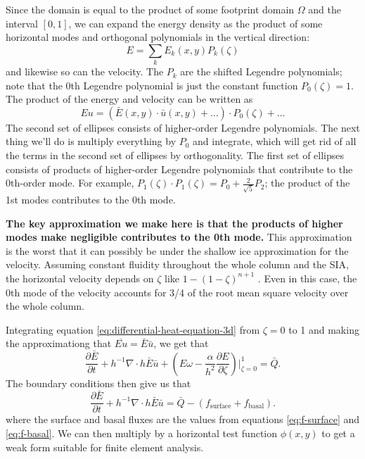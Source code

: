 \documentclass{article}
\theoremstyle{definition}
\theoremstyle{plain}
\begin{document}
Since the domain is equal to the product of some footprint domain $\Omega$ and the interval $[0, 1]$, we can expand the energy density as the product of some horizontal modes and orthogonal polynomials in the vertical direction:
\begin{equation}
    E = \sum_kE_k(x, y)P_k(\zeta)
\end{equation}
and likewise so can the velocity.
The $P_k$ are the shifted Legendre polynomials; note that the 0th Legendre polynomial is just the constant function $P_0(\zeta) = 1$.
The product of the energy and velocity can be written as
\begin{equation}
    Eu = \left(\bar E(x, y)\cdot\bar u(x, y) + \ldots\right)\cdot P_0(\zeta) + \ldots
\end{equation}
The second set of ellipses consists of higher-order Legendre polynomials.
The next thing we'll do is multiply everything by $P_0$ and integrate, which will get rid of all the terms in the second set of ellipses by orthogonality.
The first set of ellipses consists of products of higher-order Legendre polynomials that contribute to the 0th-order mode.
For example, $P_1(\zeta)\cdot P_1(\zeta) = P_0 + \frac{2}{\sqrt{5}}P_2$; the product of the 1st modes contributes to the 0th mode.

\textbf{The key approximation we make here is that the products of higher modes make negligible contributes to the 0th mode.}
This approximation is the worst that it can possibly be under the shallow ice approximation for the velocity.
Assuming constant fluidity throughout the whole column and the SIA, the horizontal velocity depends on $\zeta$ like $1 - (1 - \zeta)^{n + 1}$ \citep{greve2009dynamics}.
Even in this case, the 0th mode of the velocity accounts for 3/4 of the root mean square velocity over the whole column.

Integrating equation \eqref{eq:differential-heat-equation-3d} from $\zeta = 0$ to 1 and making the approximationg that $\overline{Eu} = \bar E\bar u$, we get that
\begin{equation}
    \frac{\partial\bar E}{\partial t} + h^{-1}\nabla\cdot h\bar E\bar u + \left(E\omega - \frac{\alpha}{h^2}\frac{\partial E}{\partial\zeta}\right)\Big|_{\zeta = 0}^1 = \bar Q.
\end{equation}
The boundary conditions then give us that
\begin{equation}
    \frac{\partial\bar E}{\partial t} + h^{-1}\nabla\cdot h\bar E\bar u = \bar Q - (f_{\text{surface}} + f_{\text{basal}}).
\end{equation}
where the surface and basal fluxes are the values from equations \eqref{eq:f-surface} and \eqref{eq:f-basal}.
We can then multiply by a horizontal test function $\phi(x, y)$ to get a weak form suitable for finite element analysis.

\pagebreak



\end{document}
